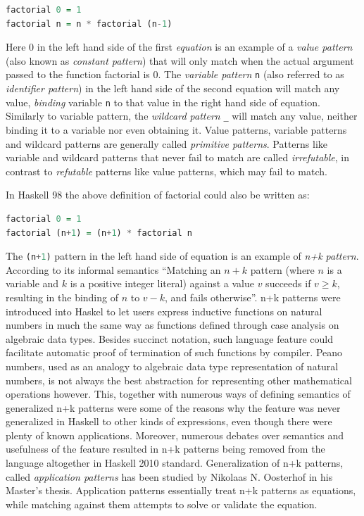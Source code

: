 \documentclass[preprint]{sigplanconf}
\DeclareRobustCommand{\codehaskell}[1]{{\lstinline[breaklines=false,language=Haskell]{#1}}}
\begin{document}
\begin{lstlisting}[language=Haskell]
factorial 0 = 1
factorial n = n * factorial (n-1)
\end{lstlisting}

\noindent
Here 0 in the left hand side of the first \emph{equation} is an example of a 
\emph{value pattern} (also known as \emph{constant pattern}) that will only 
match when the actual argument passed to the function factorial is 0. The 
\emph{variable pattern} \codehaskell{n} (also referred to as \emph{identifier 
pattern}) in the left hand side of the second equation will match any value, 
\emph{binding} variable \codehaskell{n} to that value in the right hand side of 
equation. Similarly to variable pattern, the \emph{wildcard pattern} \codehaskell{_} 
will match any value, neither binding it to a variable nor even obtaining it. 
Value patterns, variable patterns and wildcard patterns are  
generally called \emph{primitive patterns}. Patterns like variable and wildcard 
patterns that never fail to match are called \emph{irrefutable}, in contrast to 
\emph{refutable} patterns like value patterns, which may fail to match.

In Haskell 98\cite{Haskell98Book} the above definition of factorial could also 
be written as:

\begin{lstlisting}[language=Haskell]
factorial 0 = 1
factorial (n+1) = (n+1) * factorial n
\end{lstlisting}

\noindent
The \codehaskell{(n+1)} pattern in the left hand side of equation is an example of 
\emph{n+k pattern}. According to its informal semantics ``Matching an $n+k$ 
pattern (where $n$ is a variable and $k$ is a positive integer literal) against 
a value $v$ succeeds if $v \ge k$, resulting in the binding of $n$ to $v-k$, and 
fails otherwise''\cite{haskell98}. n+k patterns were introduced into Haskel to 
let users express inductive functions on natural numbers in much the same way as 
functions defined through case analysis on algebraic data types. Besides 
succinct notation, such language feature could facilitate automatic proof of 
termination of such functions by compiler. Peano numbers, used as an analogy to 
algebraic data type representation of natural numbers, is not always the best 
abstraction for representing other mathematical operations however. This,  
together with numerous ways of defining semantics of generalized n+k patterns 
were some of the reasons why the feature was never generalized in Haskell to 
other kinds of expressions, even though there were plenty of known applications. 
Moreover, numerous debates over semantics and usefulness of the feature 
resulted in n+k patterns being removed from the language altogether in Haskell 
2010 standard\cite{haskell2010}. Generalization of n+k patterns, called 
\emph{application patterns} has been studied by Nikolaas N. Oosterhof in his 
Master's thesis\cite{OosterhofThesis}. Application patterns essentially treat 
n+k patterns as equations, while matching against them attempts to solve or 
validate the equation.
\end{document}
